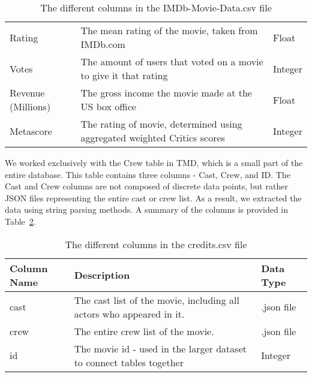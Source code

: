 \begin{table}[h]
\begin{tabular}{lp{10cm}l}
                Rating             & The mean rating of the movie, taken from IMDb.com                          & Float     \\
                Votes              & The amount of users that voted on a movie to give it that rating           & Integer   \\
                Revenue (Millions) & The gross income the movie made at the US box office                       & Float     \\
                Metascore          & The rating of movie, determined using aggregated weighted Critics scores   & Integer   \\
                \bottomrule
            \end{tabular}
            \caption[short]{The different columns in the IMDb-Movie-Data.csv file}\label{tab-IMDb-Movie-Data-Column-Description}
        \end{table}

        We worked exclusively with the Crew table in TMD, which is a small part of the
            entire database.
        This table contains three columns - Cast, Crew, and ID.
        The Cast and Crew columns are not composed of discrete data points, 
            but rather JSON files representing the entire cast or crew list. 
        As a result, we extracted the data using string parsing methods. 
        A summary of the columns is provided in Table~\ref{tab-Credits-Column-Description}.
        \begin{table}[h]
            \centering
            \begin{tabular}{lp{10cm}l}
                \toprule
                Column Name & Description                                                              & Data Type  \\
                \midrule
                cast        & The cast list of the movie, including all actors who appeared in it.     & .json file \\
                crew        & The entire crew list of the movie. & .json file \\
                id          & The movie id - used in the larger dataset to connect tables together     & Integer    \\
                \bottomrule
            \end{tabular}
            \caption[short]{The different columns in the credits.csv file}\label{tab-Credits-Column-Description}
        \end{table}

